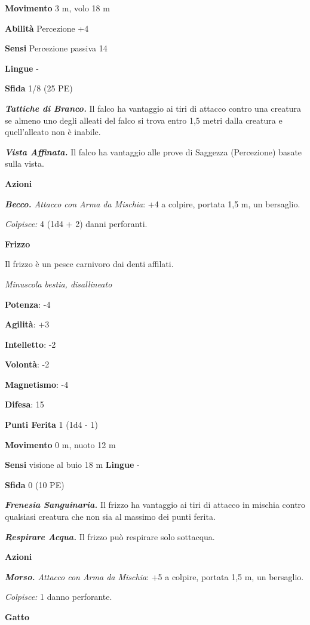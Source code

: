 \begin{multicols}{2}
\textbf{Movimento} 3 m, volo 18 m

\textbf{Abilità} Percezione +4

\textbf{Sensi} Percezione passiva 14

\textbf{Lingue} -

\textbf{Sfida} 1/8 (25 PE)

\emph{\textbf{Tattiche di Branco.}} Il falco ha vantaggio ai tiri di
attacco contro una creatura se almeno uno degli alleati del falco si
trova entro 1,5 metri dalla creatura e quell'alleato non è inabile.

\emph{\textbf{Vista Affinata.}} Il falco ha vantaggio alle prove di
Saggezza (Percezione) basate sulla vista.

\textbf{Azioni}

\emph{\textbf{Becco.} Attacco con Arma da Mischia}: +4 a colpire,
portata 1,5 m, un bersaglio.

\emph{Colpisce:} 4 (1d4 + 2) danni perforanti.



\textbf{Frizzo}

Il frizzo è un pesce carnivoro dai denti affilati.

\emph{Minuscola bestia, disallineato}

\textbf{Potenza}: -4

\textbf{Agilità}: +3

\textbf{Intelletto}: -2

\textbf{Volontà}: -2

\textbf{Magnetismo}: -4

\textbf{Difesa}: 15

\textbf{Punti Ferita} 1 (1d4 - 1)

\textbf{Movimento} 0 m, nuoto 12 m

\textbf{Sensi} visione al buio 18 m
\textbf{Lingue} -

\textbf{Sfida} 0 (10 PE)

\emph{\textbf{Frenesia Sanguinaria.}} Il frizzo ha vantaggio ai tiri di
attacco in mischia contro qualsiasi creatura che non sia al massimo dei
punti ferita.

\emph{\textbf{Respirare Acqua.}} Il frizzo può respirare solo sottacqua.

\textbf{Azioni}

\emph{\textbf{Morso.} Attacco con Arma da Mischia}: +5 a colpire,
portata 1,5 m, un bersaglio.

\emph{Colpisce:} 1 danno perforante.

\textbf{Gatto}


\end{multicols}
